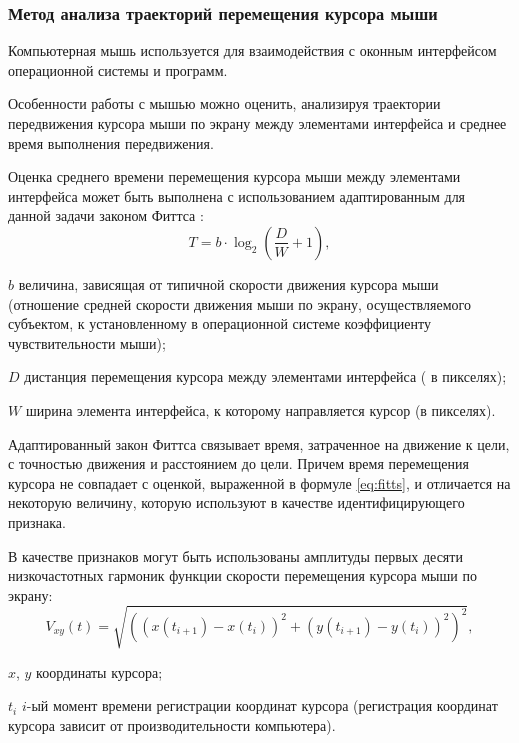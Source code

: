 \subsubsection{Метод анализа траекторий перемещения курсора мыши}
Компьютерная мышь используется для взаимодействия с оконным интерфейсом операционной системы и программ.

Особенности работы с мышью можно оценить, анализируя траектории передвижения курсора мыши по экрану между элементами интерфейса и среднее время выполнения передвижения. \cite{recognitionOfPsycho}

Оценка среднего времени перемещения курсора мыши между элементами интерфейса может быть выполнена с использованием адаптированным для данной задачи законом Фиттса \cite{fitts}:
\begin{equation}
\label{eq:fitts}
T = b \cdot \log_{2}\left(\frac{D}{W} + 1\right),
\end{equation}
\begin{eqexpl}[15mm]
\item{$b$} величина, зависящая от типичной скорости движения курсора мыши (отношение средней скорости движения мыши по экрану, осуществляемого субъектом, к установленному в операционной системе коэффициенту чувствительности мыши);
\item{$D$} дистанция перемещения курсора между элементами интерфейса ( в пикселях);
\item{$W$} ширина элемента интерфейса, к которому направляется курсор (в пикселях).
\end{eqexpl}

Адаптированный закон Фиттса связывает время, затраченное на движение к цели, с точностью движения и расстоянием до цели. Причем время перемещения курсора не совпадает с оценкой, выраженной в формуле \eqref{eq:fitts}, и отличается на некоторую величину, которую используют в качестве идентифицирующего признака. \cite{mouseMethod}

В качестве признаков могут быть использованы амплитуды первых десяти низкочастотных гармоник функции скорости перемещения курсора мыши по экрану:
\begin{equation}
\label{eq:harmonic}
V_{xy}(t) = \sqrt{\left(\left(x\left(t_{i+1}\right) - x\left(t_i\right)\right)^2 + \left(y\left(t_{i+1}\right)-y\left(t_i\right)\right)^2\right)^2},
\end{equation}
\begin{eqexpl}[15mm]
\item{$x$, $y$} координаты курсора;
\item{$t_i$} $i$-ый момент времени регистрации координат курсора (регистрация координат курсора зависит от производительности компьютера).
\end{eqexpl}

